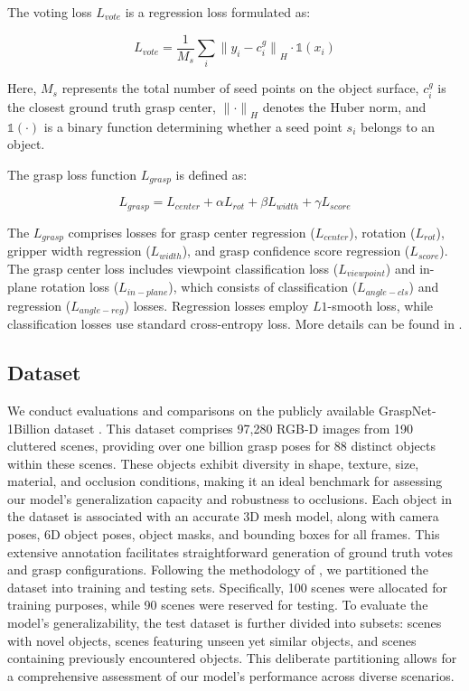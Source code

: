 The voting loss $L_{vote}$ is a regression loss formulated as:

\begin{equation}
L_{vote} = \frac{1}{M_s} \sum_{i}^{} {\lVert y_i - c^g_i \rVert}_H \cdot \mathds{1}(x_i)
\end{equation}

Here, $M_s$ represents the total number of seed points on the object surface, $c^g_i$ is the closest ground truth grasp center, ${\lVert \cdot \rVert}_H$ denotes the Huber norm, and $\mathds{1}(\cdot)$ is a binary function determining whether a seed point $s_i$ belongs to an object.

The grasp loss function $L_{grasp}$ is defined as:

\begin{equation}
L_{grasp} = L_{center} + \alpha L_{rot} + \beta L_{width} + \gamma L_{score}
\end{equation}

The $L_{grasp}$ comprises losses for grasp center regression ($L_{center}$), rotation ($L_{rot}$), gripper width regression ($L_{width}$), and grasp confidence score regression ($L_{score}$). The grasp center loss includes viewpoint classification loss ($L_{viewpoint}$) and in-plane rotation loss ($L_{in-plane}$), which consists of classification ($L_{angle-cls}$) and regression ($L_{angle-reg}$) losses. Regression losses employ $L1$-smooth loss, while classification losses use standard cross-entropy loss. More details can be found in \cite{hoang2023grasp}.

\subsection{Dataset}


We conduct evaluations and comparisons on the publicly available GraspNet-1Billion dataset \cite{fang2020graspnet}. This dataset comprises 97,280 RGB-D images from 190 cluttered scenes, providing over one billion grasp poses for 88 distinct objects within these scenes. These objects exhibit diversity in shape, texture, size, material, and occlusion conditions, making it an ideal benchmark for assessing our model's generalization capacity and robustness to occlusions. Each object in the dataset is associated with an accurate 3D mesh model, along with camera poses, 6D object poses, object masks, and bounding boxes for all frames. This extensive annotation facilitates straightforward generation of ground truth votes and grasp configurations. Following the methodology of \cite{fang2020graspnet}, we partitioned the dataset into training and testing sets. Specifically, 100 scenes were allocated for training purposes, while 90 scenes were reserved for testing. To evaluate the model's generalizability, the test dataset is further divided into subsets: scenes with novel objects, scenes featuring unseen yet similar objects, and scenes containing previously encountered objects. This deliberate partitioning allows for a comprehensive assessment of our model's performance across diverse scenarios.
